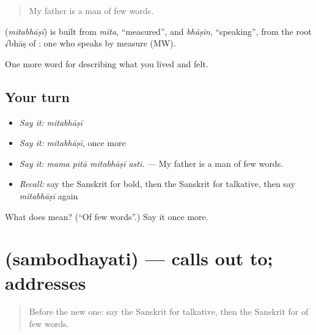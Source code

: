 \begin{quote}
My father is a man of few words.
\end{quote}

\begin{cousinweb}
\textbf{} (\emph{mitabhāṣī}) is built from \emph{mita}, \textquotedblleft{}measured\textquotedblright{}, and \emph{bhāṣin}, \textquotedblleft{}speaking\textquotedblright{}, from the root √bhāṣ of \textbf{}: one who speaks by measure (MW).
\end{cousinweb}

\begin{grammarlens}[title={What you've built}]
One more word for describing what you lived and felt.
\end{grammarlens}

\subsection*{Your turn}
\begin{itemize}
\raggedright
  \item \emph{Say it:} \emph{mitabhāṣī}
  \item \emph{Say it:} \emph{mitabhāṣī}, once more
  \item \emph{Say it:} \emph{mama pitā mitabhāṣī asti.} — My father is a man of few words.
  \item \emph{Recall:} say the Sanskrit for bold, then the Sanskrit for talkative, then say \emph{mitabhāṣī} again
\end{itemize}

\begin{tcolorbox}[breakable,colback=teal!4,colframe=teal!35!black,title={Before you move on}]
What does  mean? (\textquotedblleft{}Of few words\textquotedblright{}.) Say it once more.
\end{tcolorbox}
\section[\texorpdfstring{\sk{सम्बोधयति} (sambodhayati)}{सम्बोधयति (sambodhayati)}]{ (sambodhayati) — calls out to; addresses}

\label{lesson:SA-C464-sambodhayati}



\begin{quote}
Before the new one: say the Sanskrit for talkative, then the Sanskrit for of few words.
\end{quote}

